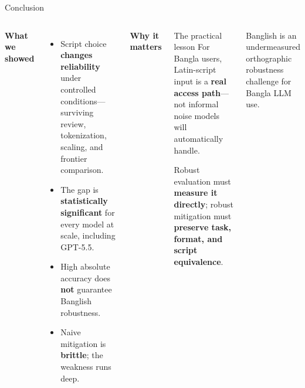 \documentclass[aspectratio=169,10pt]{beamer}
\begin{document}
\begin{frame}{Conclusion}
\begin{columns}[T]
\small\textbf{What we showed}
\begin{itemize}\setlength\itemsep{5pt}
\item[\ic{check}{good}] Script choice \textbf{changes reliability} under controlled conditions—surviving review, tokenization, scaling, and frontier comparison.
\item[\ic{check}{good}] The gap is \textbf{statistically significant} for every model at scale, including GPT-5.5.
\item[\ic{check}{good}] High absolute accuracy does \textbf{not} guarantee Banglish robustness.
\item[\ic{check}{good}] Naive mitigation is \textbf{brittle}; the weakness runs deep.
\end{itemize}
\small\textbf{Why it matters}
\begin{takebox}{The practical lesson}
\small For Bangla users, Latin-script input is a \textbf{real access path}—not informal noise models will automatically handle.
\smallskip

Robust evaluation must \textbf{measure it directly}; robust mitigation must \textbf{preserve task, format, and script equivalence}.
\end{takebox}
\medskip
\footnotesize\color{subink} Banglish is an undermeasured orthographic robustness challenge for Bangla LLM use.
\end{columns}
\end{frame}
\end{document}
